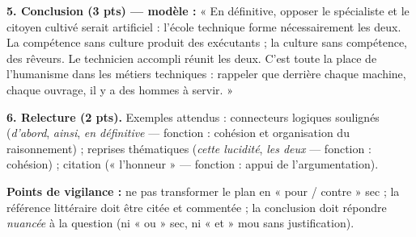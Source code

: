 \documentclass[11pt]{article}
\begin{document}
\begin{corrige}
\textbf{5. Conclusion (3 pts) — modèle :} « En définitive, opposer le spécialiste et le citoyen cultivé serait artificiel : l'école technique forme nécessairement les deux. La compétence sans culture produit des exécutants ; la culture sans compétence, des rêveurs. Le technicien accompli réunit les deux. C'est toute la place de l'humanisme dans les métiers techniques : rappeler que derrière chaque machine, chaque ouvrage, il y a des hommes à servir. »

\textbf{6. Relecture (2 pts).} Exemples attendus : connecteurs logiques soulignés (\emph{d'abord}, \emph{ainsi}, \emph{en définitive} — fonction : cohésion et organisation du raisonnement) ; reprises thématiques (\emph{cette lucidité}, \emph{les deux} — fonction : cohésion) ; citation (« l'honneur » — fonction : appui de l'argumentation).

\textbf{Points de vigilance :} ne pas transformer le plan en « pour / contre » sec ; la référence littéraire doit être citée et commentée ; la conclusion doit répondre \emph{nuancée} à la question (ni « ou » sec, ni « et » mou sans justification).
\end{corrige}
\end{document}
